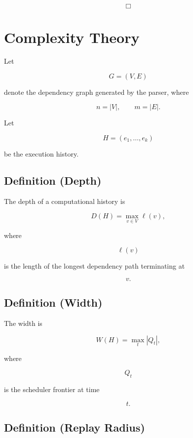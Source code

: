 \documentclass[12pt,oneside]{article}
\theoremstyle{definition}
\theoremstyle{remark}
\begin{document}
\[
\Box
\]

\section{Complexity Theory}

Let

\[
G=(V,E)
\]

denote the dependency graph generated by the parser, where

\[
n=|V|,
\qquad
m=|E|.
\]

Let

\[
H=(e_1,\ldots,e_k)
\]

be the execution history.

\subsection*{Definition (Depth)}

The depth of a computational history is

\[
D(H)
=
\max_{v\in V}
\ell(v),
\]

where

\[
\ell(v)
\]

is the length of the longest dependency path terminating at

\[
v.
\]

\subsection*{Definition (Width)}

The width is

\[
W(H)
=
\max_t
|Q_t|,
\]

where

\[
Q_t
\]

is the scheduler frontier at time

\[
t.
\]

\subsection*{Definition (Replay Radius)}
\end{document}
